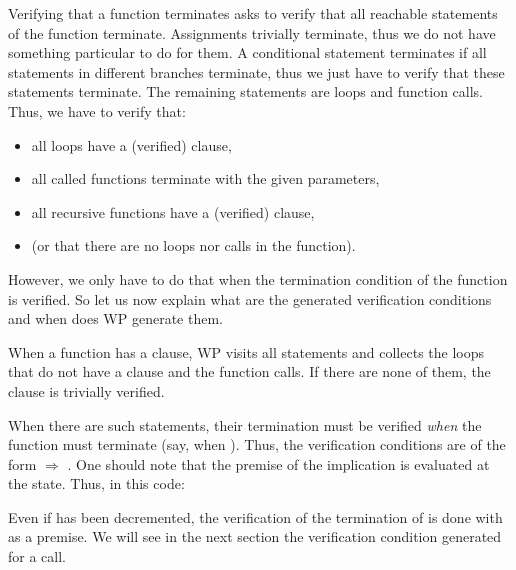 


Verifying that a function terminates asks to verify that all reachable
statements of the function terminate. Assignments trivially terminate, thus
we do not have something particular to do for them. A conditional statement
terminates if all statements in different branches terminate, thus we just
have to verify that these statements terminate. The remaining statements are
loops and function calls. Thus, we have to verify that:
\begin{itemize}
  \item all loops have a (verified)  clause,
  \item all called functions terminate with the given parameters,
  \item all recursive functions have a (verified)  clause,
  \item (or that there are no loops nor calls in the function).
\end{itemize}



However, we only have to do that when the termination condition of the function
is verified. So let us now explain what are the generated verification
conditions and when does WP generate them.



When a function has a  clause, WP visits all statements
and collects the loops that do not have a  clause and
the function calls. If there are none of them, the 
clause is trivially verified.






When there are such statements, their termination must be verified {\em when}
the function must terminate (say, when ). Thus, the verification
conditions are of the form
 $\Rightarrow$ .
One should note that the premise of the implication is evaluated at the
 state. Thus, in this code:






Even if  has been decremented, the verification of the
termination of  is done with
 as a premise. We will see in the
next section the verification condition generated for a call.



